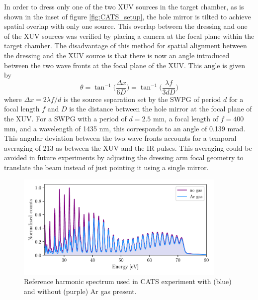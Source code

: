 In order to dress only one of the two XUV sources in the target chamber, as is shown in the inset of figure \ref{fig:CATS_setup}, the hole mirror is tilted to achieve spatial overlap with only one source.  This overlap between the dressing and one of the XUV sources was verified by placing a camera at the focal plane within the target chamber.  The disadvantage of this method for spatial alignment between the dressing and the XUV source is that there is now an angle introduced between the two wave fronts at the focal plane of the XUV.  This angle is given by
\begin{equation}
	\theta = \tan^{-1}\bigg(\frac{\Delta x}{6 D}\bigg) = \tan^{-1}\bigg(\frac{\lambda f}{3 d D}\bigg)
\end{equation}
where $\Delta x = 2\lambda f /d$ is the source separation set by the SWPG of period $d$ for a focal length $f$ and $D$ is the distance between the hole mirror at the focal plane of the XUV. For a SWPG with a period of $d=2.5$ mm, a focal length of $f=400$ mm, and a wavelength of 1435 nm, this corresponds to an angle of 0.139 mrad.  This angular deviation between the two wave fronts accounts for a temporal averaging of 213 as between the XUV and the IR pulses.  This averaging could be avoided in future experiments by adjusting the dressing arm focal geometry to translate the beam instead of just pointing it using a single mirror.

\begin{figure}
	\centering
	\includegraphics[width=0.9\textwidth]{figures/CATS/ref_harmonic_spectrum.pdf}
	\caption[Reference harmonic spectrum used in CATS experiment]{Reference harmonic spectrum used in CATS experiment with (blue) and without (purple) Ar gas present.}
	\label{fig:ref_harmonic_spectrum}
\end{figure}

